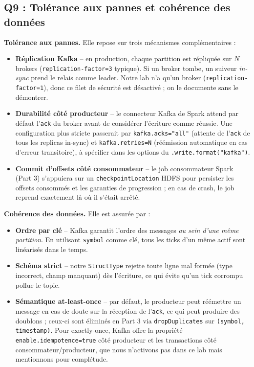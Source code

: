 \documentclass{RapportINPTCLOUD}
\begin{document}
\subsection{Q9 : Tol\'{e}rance aux pannes et coh\'{e}rence des donn\'{e}es}

\textbf{Tol\'{e}rance aux pannes.} Elle repose sur trois m\'{e}canismes compl\'{e}mentaires :

\begin{itemize}[leftmargin=2em]
    \item \textbf{R\'{e}plication Kafka} -- en production, chaque partition est r\'{e}pliqu\'{e}e sur $N$ brokers (\texttt{replication-factor=3} typique). Si un broker tombe, un suiveur \textit{in-sync} prend le relais comme leader. Notre lab n'a qu'un broker (\texttt{replication-factor=1}), donc ce filet de s\'{e}curit\'{e} est d\'{e}sactiv\'{e} ; on le documente sans le d\'{e}montrer.
    \item \textbf{Durabilit\'{e} c\^{o}t\'{e} producteur} -- le connecteur Kafka de Spark attend par d\'{e}faut l'\texttt{ack} du broker avant de consid\'{e}rer l'\'{e}criture comme r\'{e}ussie. Une configuration plus stricte passerait par \texttt{kafka.acks="all"} (attente de l'\texttt{ack} de tous les replicas in-sync) et \texttt{kafka.retries=N} (r\'{e}\'{e}mission automatique en cas d'erreur transitoire), \`{a} sp\'{e}cifier dans les options du \texttt{.write.format("kafka")}.
    \item \textbf{Commit d'offsets c\^{o}t\'{e} consommateur} -- le job consommateur Spark (Part 3) s'appuiera sur un \texttt{checkpointLocation} HDFS pour persister les offsets consomm\'{e}s et les garanties de progression ; en cas de crash, le job reprend exactement l\`{a} o\`{u} il s'\'{e}tait arr\^{e}t\'{e}.
\end{itemize}

\textbf{Coh\'{e}rence des donn\'{e}es.} Elle est assur\'{e}e par :
\begin{itemize}[leftmargin=2em]
    \item \textbf{Ordre par cl\'{e}} -- Kafka garantit l'ordre des messages \textit{au sein d'une m\^{e}me partition}. En utilisant \texttt{symbol} comme cl\'{e}, tous les ticks d'un m\^{e}me actif sont lin\'{e}aris\'{e}s dans le temps.
    \item \textbf{Sch\'{e}ma strict} -- notre \texttt{StructType} rejette toute ligne mal form\'{e}e (type incorrect, champ manquant) d\`{e}s l'\'{e}criture, ce qui \'{e}vite qu'un tick corrompu pollue le topic.
    \item \textbf{S\'{e}mantique at-least-once} -- par d\'{e}faut, le producteur peut r\'{e}\'{e}mettre un message en cas de doute sur la r\'{e}ception de l'\texttt{ack}, ce qui peut produire des doublons ; ceux-ci sont \'{e}limin\'{e}s en Part 3 via \texttt{dropDuplicates} sur \texttt{(symbol, timestamp)}. Pour exactly-once, Kafka offre la propri\'{e}t\'{e} \texttt{enable.idempotence=true} c\^{o}t\'{e} producteur et les transactions c\^{o}t\'{e} consommateur/producteur, que nous n'activons pas dans ce lab mais mentionnons pour compl\'{e}tude.
\end{itemize}
\end{document}
